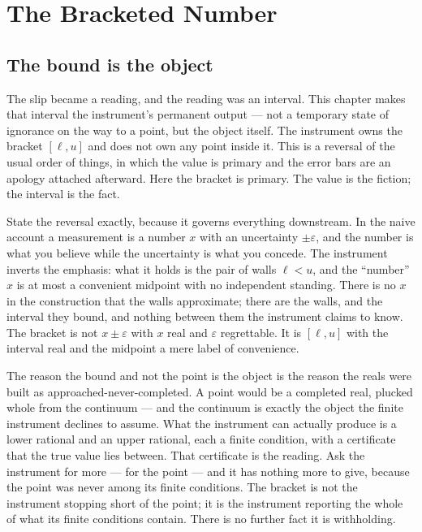 \chapter{The Bracketed Number}

\section{The bound is the object}

The slip became a reading, and the reading was an interval. This chapter makes that interval the instrument's permanent
output --- not a temporary state of ignorance on the way to a point, but the object itself. The instrument owns the bracket
$[\ell, u]$ and does not own any point inside it. This is a reversal of the usual order of things, in which the value is
primary and the error bars are an apology attached afterward. Here the bracket is primary. The value is the fiction; the
interval is the fact.

State the reversal exactly, because it governs everything downstream. In the naive account a measurement is a number
$x$ with an uncertainty $\pm\varepsilon$, and the number is what you believe while the uncertainty is what you concede. The
instrument inverts the emphasis: what it holds is the pair of walls $\ell < u$, and the ``number'' $x$ is at most a
convenient midpoint with no independent standing. There is no $x$ in the construction that the walls approximate; there are
the walls, and the interval they bound, and nothing between them the instrument claims to know. The bracket is not $x \pm
\varepsilon$ with $x$ real and $\varepsilon$ regrettable. It is $[\ell, u]$ with the interval real and the midpoint a mere
label of convenience.

The reason the bound and not the point is the object is the reason the reals were built as approached-never-completed. A
point would be a completed real, plucked whole from the continuum --- and the continuum is exactly the object the finite
instrument declines to assume. What the instrument can actually produce is a lower rational and an upper rational, each a
finite condition, with a certificate that the true value lies between. That certificate is the reading. Ask the instrument
for more --- for the point --- and it has nothing more to give, because the point was never among its finite conditions. The
bracket is not the instrument stopping short of the point; it is the instrument reporting the whole of what its finite
conditions contain. There is no further fact it is withholding.

